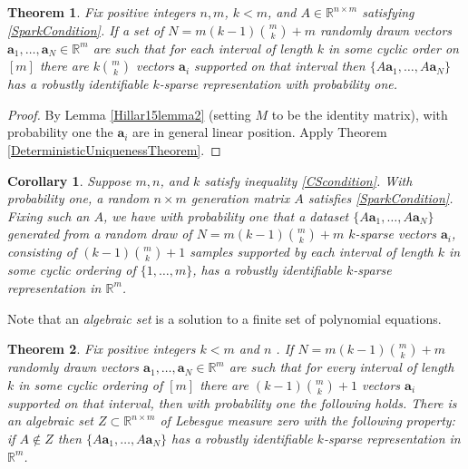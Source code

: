 \documentclass[journal, onecolumn]{IEEEtran}
\newtheorem{theorem}{Theorem}
\newtheorem{corollary}{Corollary}
\begin{document}
\begin{theorem}\label{Theorem2}
Fix positive integers $n, m$, $k < m$, and $A \in \mathbb{R}^{n \times m}$ satisfying \eqref{SparkCondition}. If a set of $N = m(k-1){m \choose k}+m$ randomly drawn vectors $\mathbf{a}_1, \ldots, \mathbf{a}_N \in \mathbb{R}^m$ are such that for each interval of length $k$ in some cyclic order on $[m]$ there are $k{m \choose k}$ vectors $\mathbf{a}_i$ supported on that interval then $\{A\mathbf{a}_1, \ldots, A\mathbf{a}_N\}$ has a robustly identifiable $k$-sparse representation with probability one.
\end{theorem}

\begin{proof}
By Lemma \ref{Hillar15lemma2} (setting $M$ to be the identity matrix), with probability one the $\mathbf{a}_i$ are in general linear position. Apply Theorem \ref{DeterministicUniquenessTheorem}.
\end{proof} 

\begin{corollary}
Suppose $m, n$, and $k$ satisfy inequality \eqref{CScondition}. With probability one, a random $n \times m$ generation matrix $A$ satisfies \eqref{SparkCondition}. Fixing such an $A$, we have with probability one that a dataset $\{A\mathbf{a}_1, \ldots , A\mathbf{a}_N\}$ generated from a random draw of $N = m(k-1){m \choose k}+m$ $k$-sparse vectors $\mathbf{a}_i$, consisting of $(k-1){m \choose k}+1$ samples supported by each interval of length $k$ in some cyclic ordering of $\{1, \ldots, m\}$, has a robustly identifiable $k$-sparse representation in $\mathbb{R}^m$.
\end{corollary}

Note that an \emph{algebraic set} is a solution to a finite set of polynomial equations. 

\begin{theorem}\label{Theorem3}
Fix positive integers $k < m$ and $n$ . If $N = m(k-1){m \choose k}+m$ randomly drawn vectors $\mathbf{a}_1, \ldots, \mathbf{a}_N \in \mathbb{R}^m$ are such that for every interval of length $k$ in some cyclic ordering of $[m]$ there are $(k-1){m \choose k}+1$ vectors $\mathbf{a}_i$ supported on that interval, then with probability one the following holds. There is an algebraic set $Z \subset \mathbb{R}^{n \times m}$ of Lebesgue measure zero with the following property: if $A \notin Z$ then $\{A\mathbf{a}_1, \ldots , A\mathbf{a}_N \}$ has a robustly identifiable $k$-sparse representation in $\mathbb{R}^m$.
\end{theorem}
\end{document}
